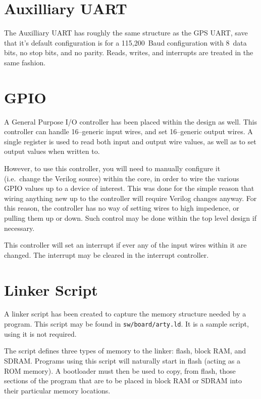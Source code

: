 \documentclass{gqtekspec}
\begin{document}
\section{Auxilliary UART}

The Auxilliary UART has roughly the same structure as the GPS UART, save that
it's default configuration is for a 115,200~Baud configuration with 8~data bits,
no stop bits, and no parity.  Reads, writes, and interrupts are treated in
the same fashion.

\section{GPIO}

A General Purpose I/O controller has been placed within the design as well.
This controller can handle 16--generic input wires, and set 16--generic output
wires.  A single register is used to read both input and output wire values,
as well as to set output values when written to. 

However, to use this controller, you will need to manually configure it
(i.e.~change the Verilog source) within the core, in order to wire the various
GPIO values up to a device of interest.  This was done for the simple reason
that wiring anything new up to the controller will require Verilog changes
anyway.  For this reason, the controller has no way of setting wires to high
impedence, or pulling them up or down.  Such control may be done within the
top level design if necessary.

This controller will set an interrupt if ever any of the input wires within
it are changed.  The interrupt may be cleared in the interrupt controller.

\section{Linker Script}

A linker script has been created to capture the memory structure needed by
a program.  This script may be found in {\tt sw/board/arty.ld}.  It is a
sample script, using it is not required.

The script defines three types of memory to the linker: flash, block RAM, and
SDRAM.  Programs using this script will naturally start in flash (acting as
a ROM memory).  A bootloader must then be used to copy, from flash, those
sections of the program that are to be placed in block RAM or SDRAM into
their particular memory locations.
\end{document}
